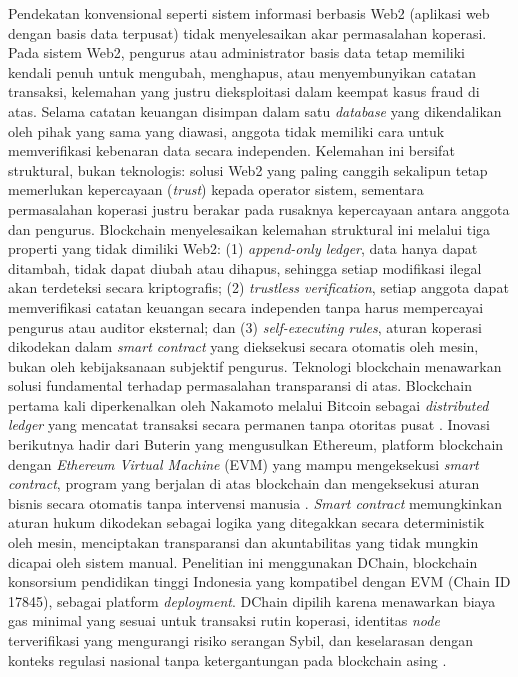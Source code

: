 \medskip
Pendekatan konvensional seperti sistem informasi berbasis Web2 (aplikasi web dengan basis data terpusat) tidak menyelesaikan akar permasalahan koperasi. Pada sistem Web2, pengurus atau administrator basis data tetap memiliki kendali penuh untuk mengubah, menghapus, atau menyembunyikan catatan transaksi, kelemahan yang justru dieksploitasi dalam keempat kasus fraud di atas. Selama catatan keuangan disimpan dalam satu \textit{database} yang dikendalikan oleh pihak yang sama yang diawasi, anggota tidak memiliki cara untuk memverifikasi kebenaran data secara independen. Kelemahan ini bersifat struktural, bukan teknologis: solusi Web2 yang paling canggih sekalipun tetap memerlukan kepercayaan (\textit{trust}) kepada operator sistem, sementara permasalahan koperasi justru berakar pada rusaknya kepercayaan antara anggota dan pengurus. Blockchain menyelesaikan kelemahan struktural ini melalui tiga properti yang tidak dimiliki Web2: (1) \textit{append-only ledger}, data hanya dapat ditambah, tidak dapat diubah atau dihapus, sehingga setiap modifikasi ilegal akan terdeteksi secara kriptografis; (2) \textit{trustless verification}, setiap anggota dapat memverifikasi catatan keuangan secara independen tanpa harus mempercayai pengurus atau auditor eksternal; dan (3) \textit{self-executing rules}, aturan koperasi dikodekan dalam \textit{smart contract} yang dieksekusi secara otomatis oleh mesin, bukan oleh kebijaksanaan subjektif pengurus.
\medskip
Teknologi blockchain menawarkan solusi fundamental terhadap permasalahan transparansi di atas. Blockchain pertama kali diperkenalkan oleh Nakamoto melalui Bitcoin sebagai \textit{distributed ledger} yang mencatat transaksi secara permanen tanpa otoritas pusat \cite{nakamoto2008bitcoin}. Inovasi berikutnya hadir dari Buterin yang mengusulkan Ethereum, platform blockchain dengan \textit{Ethereum Virtual Machine} (EVM) yang mampu mengeksekusi \textit{smart contract}, program yang berjalan di atas blockchain dan mengeksekusi aturan bisnis secara otomatis tanpa intervensi manusia \cite{buterin2014ethereum,wood2014ethereum}. \textit{Smart contract} memungkinkan aturan hukum dikodekan sebagai logika yang ditegakkan secara deterministik oleh mesin, menciptakan transparansi dan akuntabilitas yang tidak mungkin dicapai oleh sistem manual. Penelitian ini menggunakan DChain, blockchain konsorsium pendidikan tinggi Indonesia yang kompatibel dengan EVM (Chain ID 17845), sebagai platform \textit{deployment}. DChain dipilih karena menawarkan biaya gas minimal yang sesuai untuk transaksi rutin koperasi, identitas \textit{node} terverifikasi yang mengurangi risiko serangan Sybil, dan keselarasan dengan konteks regulasi nasional tanpa ketergantungan pada blockchain asing \cite{wood2014ethereum}.

